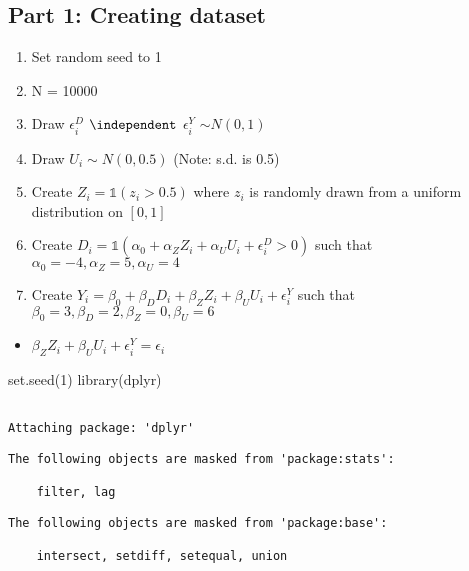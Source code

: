 \documentclass[
  letterpaper,
  DIV=11,
  numbers=noendperiod]{scrartcl}
\newenvironment{Shaded}{\begin{snugshade}}{\end{snugshade}}
\newcommand{\DecValTok}[1]{\textcolor[rgb]{0.68,0.00,0.00}{#1}}
\newcommand{\FunctionTok}[1]{\textcolor[rgb]{0.28,0.35,0.67}{#1}}
\newcommand{\NormalTok}[1]{\textcolor[rgb]{0.00,0.23,0.31}{#1}}
\providecommand{\tightlist}{%
  \setlength{\itemsep}{0pt}\setlength{\parskip}{0pt}}
\begin{document}
\subsection{Part 1: Creating dataset}\label{part-1-creating-dataset}

\begin{enumerate}
\def\labelenumi{\arabic{enumi}.}
\tightlist
\item
  Set random seed to 1
\item
  N = 10000
\item
  Draw \(\epsilon_i^D\) \(\independent\) \(\epsilon_i^Y\)
  \(\sim N(0,1)\)
\item
  Draw \(U_i \sim N(0,0.5)\) (Note: s.d. is 0.5)
\item
  Create \(Z_i = \mathbb{1}(z_i > 0.5)\) where \(z_i\) is randomly drawn
  from a uniform distribution on \([0,1]\)
\item
  Create
  \(D_i = \mathbb{1}(\alpha_0 + \alpha_Z Z_i + \alpha_UU_i + \epsilon_i^D > 0)\)
  such that \(\alpha_0 = -4, \alpha_Z = 5, \alpha_U = 4\)
\item
  Create
  \(Y_i = \beta_0 + \beta_D D_i + \beta_Z Z_i + \beta_U U_i + \epsilon_i^Y\)
  such that \(\beta_0 = 3, \beta_D = 2, \beta_Z = 0, \beta_U = 6\)
\end{enumerate}

\begin{itemize}
\tightlist
\item
  \(\beta_Z Z_i + \beta_U U_i + \epsilon_i^Y = \epsilon_i\)
\end{itemize}

\begin{Shaded}
\begin{Highlighting}[]
\FunctionTok{set.seed}\NormalTok{(}\DecValTok{1}\NormalTok{)}
\FunctionTok{library}\NormalTok{(dplyr)}
\end{Highlighting}
\end{Shaded}

\begin{verbatim}

Attaching package: 'dplyr'
\end{verbatim}

\begin{verbatim}
The following objects are masked from 'package:stats':

    filter, lag
\end{verbatim}

\begin{verbatim}
The following objects are masked from 'package:base':

    intersect, setdiff, setequal, union
\end{verbatim}
\end{document}
